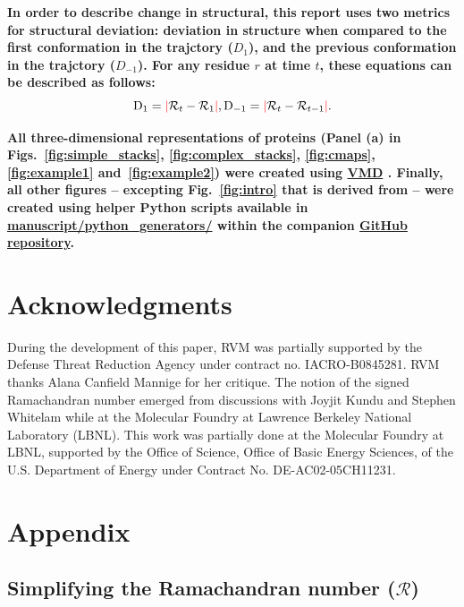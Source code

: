 \documentclass[fleqn,10pt,lineno]{wlpeerj} %
\newcommand{\Fig}[1]{Fig.~\ref{#1}}
\newcommand{\Figs}[1]{Figs.~\ref{#1}}
\newcommand{\n}[1]{{\textbf{\color{red}#1}}}
\begin{document}
\n{In order to describe change in structural, this report uses two metrics for structural deviation: deviation in structure when compared to the first conformation in the trajctory ($D_1$), and the previous conformation in the trajctory ($D_{-1}$). For any residue $r$ at time $t$, these equations can be described as follows:}
\begin{equation}
\textrm{D}_{1}  = \textcolor{red}{\mid} \mathcal{R}_{t}-\mathcal{R}_{1}   \textcolor{red}{\mid}, \\
\textrm{D}_{-1} = \textcolor{red}{\mid} \mathcal{R}_{t}-\mathcal{R}_{t-1} \textcolor{red}{\mid}.
\end{equation}

\n{All three-dimensional representations of proteins (Panel (a) in \Figs{fig:simple_stacks}, \ref{fig:complex_stacks}, \ref{fig:cmaps}, \ref{fig:example1} and~\ref{fig:example2}) were created using \href{http://www.ks.uiuc.edu/Research/vmd/}{VMD} \citep{Humphrey1996}. Finally, all other figures -- excepting \Fig{fig:intro} that is derived from \cite{Mannige2016} -- were created using helper Python scripts available in \href{https://github.com/ranjanmannige/backmap/blob/master/manuscript/python_generators/}{manuscript/python\_generators/} within the companion \href{https://github.com/ranjanmannige/backmap/}{GitHub repository}.}

\section*{Acknowledgments}

During the development of this paper, RVM was partially supported by the Defense Threat Reduction Agency under contract no. IACRO-B0845281. RVM thanks Alana Canfield Mannige for her critique. The notion of the signed Ramachandran number emerged from discussions with Joyjit Kundu and Stephen Whitelam while at the Molecular Foundry at Lawrence Berkeley National Laboratory (LBNL). This work was partially done at the Molecular Foundry at LBNL, supported by the Office of Science, Office of Basic Energy Sciences, of the U.S. Department of Energy under Contract No. DE-AC02-05CH11231.

\section*{Appendix}

\subsection*{Simplifying the Ramachandran number ($\mathcal{R}$)\label{sec:simplifyR}}
\end{document}
